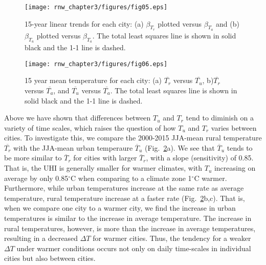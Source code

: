 {\begin{figure}
\texttt{[image: rnw\_chapter3/figures/fig05.eps]}
\caption{15-year linear trends for each city: (a) $\beta_{T_r}$ plotted versus $\beta_{ T_a}$ and (b)  $\beta_{T_u}$ plotted versus $\beta_{ T_a}$. The total least squares line is shown in solid black and the 1-1 line is dashed.
}
\label{fig:30yrtrend4}
\end{figure}

\begin{figure}
\texttt{[image: rnw\_chapter3/figures/fig06.eps]}
\caption{15 year mean temperature for each city: (a) $\overline{T_r}$ versus $\overline{ T_u}$, b)$\overline{T_r}$ versus $\overline{ T_a}$, and $\overline{T_u}$ versus $\overline{ T_a}$.
The total least squares line is shown in solid black and the 1-1 line is dashed.
}
\label{fig:meantemp4}
\end{figure}


Above we have shown that differences between $T_u$ and $T_r$ tend to diminish %
on a variety of time scales, which raises the question of how $T_u$ and $T_r$ varies between cities.
 To investigate this, we compare the 2000-2015 JJA-mean rural temperature $\overline{T_r}$ with the JJA-mean urban temperaure $\overline{T}_{u}$ (Fig.~\ref{fig:meantemp4}a).  We see that $\overline{T}_u$ tends to be more similar to $\overline{T}_r$ for cities with larger $\overline{T}_{r}$, 
 with a slope (sensitivity) of 0.85. %
 That is, the UHI is generally smaller for warmer climates, with $T_u$ increasing on average by only 0.85$^\circ $C when comparing to a climate zone 1$^\circ$C warmer. Furthermore, while urban temperatures increase at the same rate as average temperature, rural temperature increase at a faster rate (Fig.~\ref{fig:meantemp4}b,c). 
That is, when we compare one city to a warmer city, we find the increase in urban temperatures is similar to the increase in average temperature. The increase in rural temperatures, however, is more than the increase in average temperatures, resulting in a decreased $\Delta T$ for warmer cities. Thus, the tendency for a weaker $\Delta T$ under warmer conditions occurs not only on daily time-scales in individual cities but also between cities. 

}
